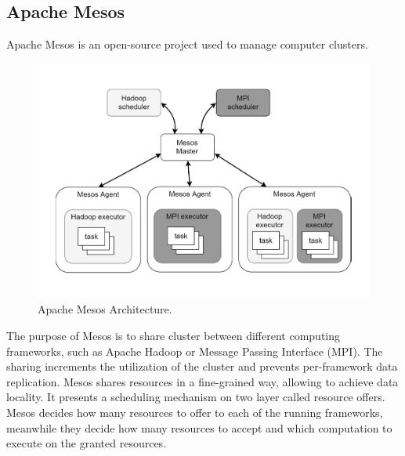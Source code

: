 \subsection{Apache Mesos}\label{sec:apache_mesos}
Apache Mesos is an open-source project used to manage computer
clusters. 
\begin{figure}
	\centering
	\includegraphics[width=\columnwidth]{Images/apache_mesos_architecture.pdf}  
	\caption[Apache Mesos Architecture]{Apache Mesos Architecture.}
	\label{fig:apacheMesosArchitecture}
\end{figure}
The purpose of Mesos is to share cluster between different computing frameworks, such as Apache Hadoop or Message Passing Interface (MPI). The sharing increments the utilization of the cluster
and prevents per-framework data replication. 
Mesos shares resources in a fine-grained way, allowing to achieve data locality. It presents
a scheduling mechanism on two layer called resource offers. Mesos decides how many resources to offer to each of the running frameworks, meanwhile they decide how many resources to accept and
which computation to execute on the granted resources. 

